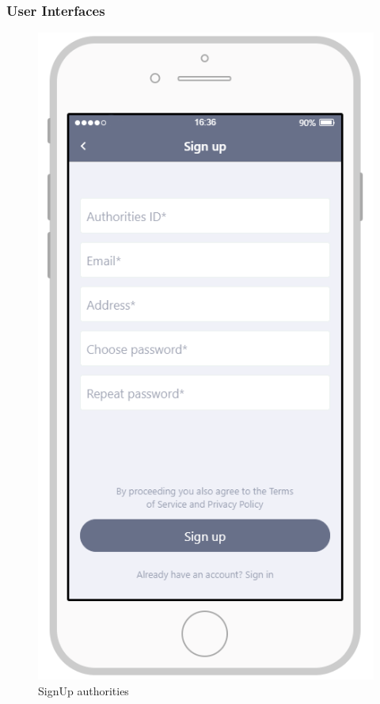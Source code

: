 \documentclass{article}
\begin{document}
\subsubsection{User Interfaces}
\begin{figure}[H]
    \centering
    \includegraphics[scale=0.7]{Images/SignUpAuthoritiesApp}
    \caption{SignUp authorities}
\end{figure}
\end{document}

